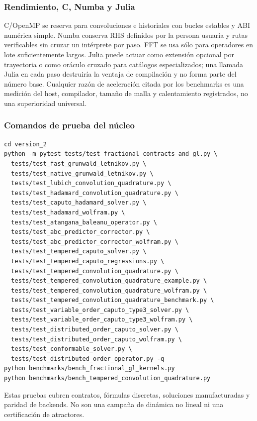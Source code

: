 \subsubsection{Rendimiento, C, Numba y Julia}

C/OpenMP se reserva para convoluciones e historiales con bucles estables y ABI
numérica simple. Numba conserva RHS definidos por la persona usuaria y rutas
verificables sin cruzar un intérprete por paso. FFT se usa sólo para operadores
en lote suficientemente largos. Julia puede actuar como extensión opcional por
trayectoria o como oráculo cruzado para catálogos especializados; una llamada
Julia en cada paso destruiría la ventaja de compilación y no forma parte del
número base. Cualquier razón de aceleración citada por los benchmarks es una
medición del host, compilador, tamaño de malla y calentamiento registrados, no
una superioridad universal.

\subsubsection{Comandos de prueba del núcleo}

\begin{verbatim}
cd version_2
python -m pytest tests/test_fractional_contracts_and_gl.py \
  tests/test_fast_grunwald_letnikov.py \
  tests/test_native_grunwald_letnikov.py \
  tests/test_lubich_convolution_quadrature.py \
  tests/test_hadamard_convolution_quadrature.py \
  tests/test_caputo_hadamard_solver.py \
  tests/test_hadamard_wolfram.py \
  tests/test_atangana_baleanu_operator.py \
  tests/test_abc_predictor_corrector.py \
  tests/test_abc_predictor_corrector_wolfram.py \
  tests/test_tempered_caputo_solver.py \
  tests/test_tempered_caputo_regressions.py \
  tests/test_tempered_convolution_quadrature.py \
  tests/test_tempered_convolution_quadrature_example.py \
  tests/test_tempered_convolution_quadrature_wolfram.py \
  tests/test_tempered_convolution_quadrature_benchmark.py \
  tests/test_variable_order_caputo_type3_solver.py \
  tests/test_variable_order_caputo_type3_wolfram.py \
  tests/test_distributed_order_caputo_solver.py \
  tests/test_distributed_order_caputo_wolfram.py \
  tests/test_conformable_solver.py \
  tests/test_distributed_order_operator.py -q
python benchmarks/bench_fractional_gl_kernels.py
python benchmarks/bench_tempered_convolution_quadrature.py
\end{verbatim}
Estas pruebas cubren contratos, fórmulas discretas, soluciones manufacturadas y
paridad de backends. No son una campaña de dinámica no lineal ni una
certificación de atractores.
